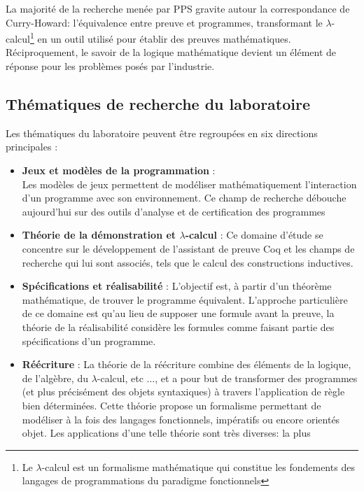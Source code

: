 \documentclass[a4paper, 11pt]{report}
\newcommand{\lc}[0]{$\lambda$-calcul\xspace}
\begin{document}
    La majorité de la recherche menée par PPS gravite autour la correspondance
    de Curry-Howard: l'équivalence entre preuve et programmes, transformant
    le \lc\footnote{Le \lc{} est un formalisme mathématique
    qui constitue les fondements des langages de programmations du paradigme fonctionnels} en un
    outil utilisé pour établir des preuves mathématiques. Réciproquement, le
    savoir de la logique mathématique devient un élément de réponse pour les
    problèmes posés par l'industrie.

    \subsection{Thématiques de recherche du laboratoire}
      Les thématiques du laboratoire peuvent être regroupées en six directions
      principales :
      \begin{itemize}
        \item \textbf{Jeux et modèles de la programmation} : \\
          Les modèles de jeux permettent de modéliser mathématiquement
          l'interaction d'un programme avec son environnement. Ce champ de
          recherche débouche aujourd'hui sur des outils d'analyse et de
          certification des programmes
        \item \textbf{Théorie de la démonstration et \lc} :
          Ce domaine d'étude se concentre sur le développement de l'assistant
          de preuve Coq et les champs de recherche qui lui sont associés,
          tels que le calcul des constructions inductives.
        \item \textbf{Spécifications et réalisabilité} :
          L'objectif est, à partir d'un théorème mathématique, de trouver
          le programme équivalent. L'approche particulière de ce domaine est
          qu'au lieu de supposer une formule avant la preuve, la théorie de la
          réalisabilité considère les formules comme faisant partie des
          spécifications d'un programme.
        \item \textbf{Réécriture} :
          La théorie de la réécriture combine des éléments de la logique, de
          l'algèbre, du \lc, etc $\ldots$, et a pour but de transformer des
          programmes (et plus précisément des objets syntaxiques) à travers
          l'application de règle bien déterminées. Cette théorie propose
          un formalisme permettant de modéliser à la fois des langages
          fonctionnels, impératifs ou encore orientés objet.
          Les applications d'une telle théorie sont très diverses: la plus

\end{itemize}
\end{document}
